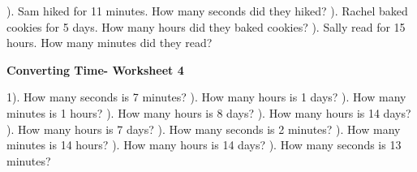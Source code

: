 \documentclass{article}%
\begin{document}
). Sam hiked for 11 minutes. How many seconds did they hiked?%
\newline%
\newline%
). Rachel baked cookies for 5 days. How many hours did they baked cookies?%
\newline%
\newline%
). Sally read for 15 hours. How many minutes did they read?%
\newline%
\newline%
\newline%
\pagebreak%
\large%
\begin{center}%
\textbf{Converting Time- Worksheet 4}%
\newline%
\end{center} \normalsize%
1). How many seconds is 7 minutes?%
\newline%
\newline%
). How many hours is 1 days?%
\newline%
\newline%
). How many minutes is 1 hours?%
\newline%
\newline%
). How many hours is 8 days?%
\newline%
\newline%
). How many hours is 14 days?%
\newline%
\newline%
). How many hours is 7 days?%
\newline%
\newline%
). How many seconds is 2 minutes?%
\newline%
\newline%
). How many minutes is 14 hours?%
\newline%
\newline%
). How many hours is 14 days?%
\newline%
\newline%
). How many seconds is 13 minutes?%
\end{document}
